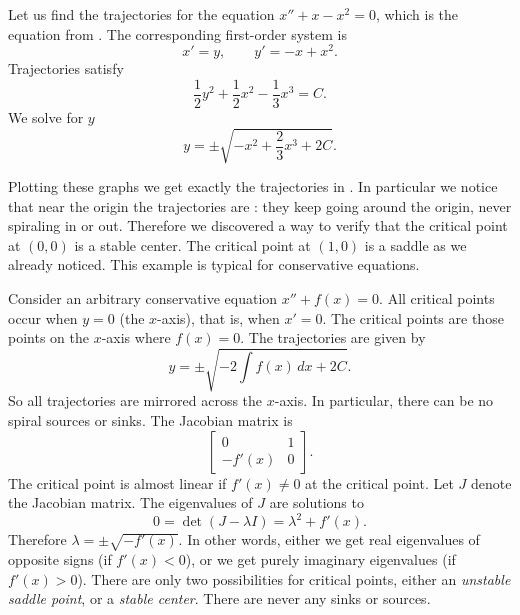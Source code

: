 \begin{example}
Let us find the trajectories for the equation $x'' + x-x^2 = 0$,
which is the equation from
.  The corresponding
first-order system is
\begin{equation*}
x' = y , \qquad y' = -x+x^2 .
\end{equation*}
Trajectories satisfy
\begin{equation*}
\frac{1}{2} y^2  + \frac{1}{2} x^2 - \frac{1}{3} x^3  = C .
\end{equation*}
We solve for $y$
\begin{equation*}
y = \pm \sqrt{-x^2 + \frac{2}{3} x^3  + 2C} .
\end{equation*}

Plotting these graphs we get exactly the trajectories in 
.  In particular we notice that near the origin
the trajectories are \emph{}: they keep going
around the origin, never spiraling in or out.  Therefore we discovered a way
to verify that the critical point at $(0,0)$ is a stable center.
The critical point at $(1,0)$ is a saddle as we already noticed.
This example is typical for conservative equations.
\end{example}

Consider an arbitrary
conservative equation $x'' + f(x) = 0$.
All critical points occur when $y=0$ (the
$x$-axis), that is, when $x' = 0$.  The critical points are 
those points on the $x$-axis where $f(x) = 0$.
The trajectories are given by
\begin{equation*}
y = \pm \sqrt{ - 2 \int f(x)\, dx + 2C} .
\end{equation*}
So all trajectories are mirrored across the $x$-axis.  In particular,
there can be no spiral sources or sinks.
The Jacobian matrix is
\begin{equation*}
\begin{bmatrix}
0 & 1 \\
-f'(x) & 0
\end{bmatrix} .
\end{equation*}
The critical point is almost linear if $f'(x) \neq 0$ at the critical 
point.  Let $J$ denote the Jacobian matrix.
The eigenvalues of $J$ are solutions to
\begin{equation*}
0 = \det(J - \lambda I) = \lambda^2 + f'(x) .
\end{equation*}
Therefore $\lambda = \pm \sqrt{-f'(x)}$.  In other words, either we get
real eigenvalues of opposite signs (if $f'(x) < 0$),
or we get purely imaginary eigenvalues (if $f'(x) > 0$).
There are only two possibilities for critical points, either an \emph{unstable
saddle point}, or a \emph{stable center}.
There are never any sinks or sources.

